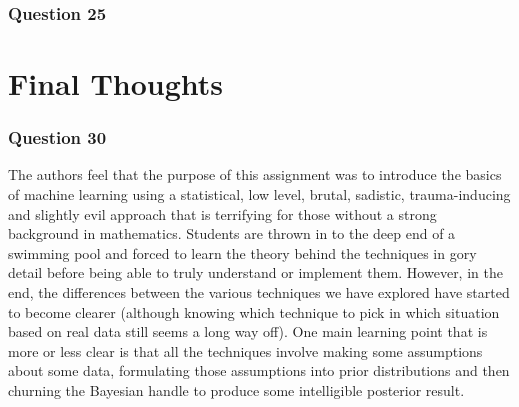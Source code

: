 \documentclass[10pt, a4paper, twocolumn]{article} %
\begin{document}
\subsubsection*{Question 25}

\section{Final Thoughts}
\subsubsection*{Question 30}
The authors feel that the purpose of this assignment was to introduce the basics of machine learning using a statistical, low level, brutal, sadistic, trauma-inducing and slightly evil approach that is terrifying for those without a strong background in mathematics. Students are thrown in to the deep end of a swimming pool and forced to learn the theory behind the techniques in gory detail before being able to truly understand or implement them. However, in the end, the differences between the various techniques we have explored have started to become clearer (although knowing which technique to pick in which situation based on real data still seems a long way off). One main learning point that is more or less clear is that all the techniques involve making some assumptions about some data, formulating those assumptions into prior distributions and then churning the Bayesian handle to produce some intelligible posterior result.


\printbibliography[title={Bibliography}] %

\end{document}
